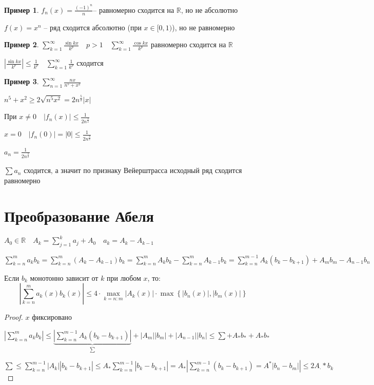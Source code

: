 \documentclass{book}
\newcommand\R{\ensuremath{\mathbb{R}}}
\theoremstyle{definition}
\newtheorem*{example}{Пример}
\begin{document}
    \begin{example}
        $f_n(x) = \frac{\left( -1 \right) ^n}{n}$-- равномерно сходится на $\R$, но не абсолютно

        $f(x) = x^n$ -- ряд сходится абсолютно (при  $x\in [0,1)$), но не равномерно
    \end{example}

    \begin{example}
        $\sum_{k=1}^{\infty } \frac{\sin kx}{k^p}\quad p >1\quad \sum_{k=1}^{\infty } \frac{\cos kx}{k^p}$ равномерно сходится на $\R$

        $\left| \frac{\sin  kx}{k^p} \right| \leqslant \frac{1}{k^p}\quad \sum_{k=1}^{\infty } \frac{1}{k^p}$ сходится
    \end{example}

    \begin{example}
        $\sum_{n=1}^{\infty } \frac{nx}{n^5 + x^2}$ 

        $n^5 + x^2 \geqslant  2\sqrt{n^5x^2} = 2n^{\frac{5}{2}}|x| $ 

        При $x \neq 0\quad |f_n(x)|\leqslant \frac{1}{2n^{\frac{3}{2}}}$

        $x = 0\quad |f_n(0)| = |0| \leqslant  \frac{1}{2n^{\frac{3}{2}}}$ 

        $a_n = \frac{1}{2n^{\frac{3}{2}}}$ 

        $\sum a_n$ сходится, а значит по признаку Вейерштрасса исходный ряд сходится равномерно
    \end{example}

    \section{Преобразование Абеля}

    $A_0\in \R\quad A_k = \sum_{j=1}^{k} a_j + A_0\quad a_k = A_k - A_{k-1}$

    $\sum_{k=n}^{m} a_kb_k = \sum_{k=n}^{m} \left( A_k - A_{k-1} \right) b_k = \sum_{k=n}^{m} A_kb_k - \sum_{k=n}^{m} A_{k-1}b_k = \sum_{k=n}^{m-1} A_k\left( b_k - b_{k+1} \right)  + A_mb_m - A_{n-1}b_n$

    \begin{lemma}
        Если $b_k$ монотонно зависит от  $k$ при любом  $x$, то: \[\left|\sum_{k=n}^{m} a_k(x)b_k(x)\right| \leqslant 4\cdot \max_{k = n:m}\left| A_k(x) \right|\cdot \max \left\{ \left| b_n(x) \right| , \left| b_m(x) \right|  \right\}  \]
    \end{lemma}
    \begin{proof}
         $x$ фиксировано

         $\left|\sum_{k=n}^{m} a_kb_k\right| \leqslant  \underbrace{\left| \sum_{k=n}^{m-1} A_k\left( b_k - b_{k+1} \right)\right|}_{\sum}  + |A_m||b_m| + |A_{n-1}||b_n|\leqslant \sum  + A_*b_* + A_* b_* $

         $\sum \leqslant \sum_{k=n}^{m-1} |A_k||b_k - b_{k+1}| \leqslant  A_* \sum_{k=n}^{m-1} \left| b_k - b_{k+1} \right|  = A_* \left| \sum_{k=n}^{m-1} \left( b_k - b_{k+1} \right)  = A^*|b_n - b_m| \right| \leqslant 2A_\cdot *b_k $
    \end{proof}
\end{document}

